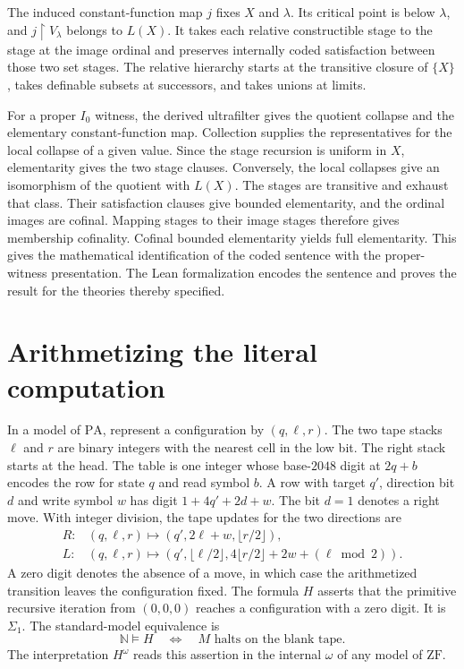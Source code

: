 \documentclass[11pt,letterpaper]{article}
\theoremstyle{definition}
\newcommand{\ZF}{\mathrm{ZF}}
\newcommand{\PA}{\mathrm{PA}}
\newcommand{\N}{\mathbb{N}}
\newcommand{\setread}[1]{#1^{\omega}}
\begin{document}
The induced constant-function map $j$ fixes $X$ and $\lambda$.
Its critical point is below $\lambda$, and $j\upharpoonright V_\lambda$
belongs to $L(X)$. It takes each relative constructible stage to
the stage at the image ordinal and preserves internally coded
satisfaction between those two set stages. The relative hierarchy
starts at the transitive closure of $\{X\}$, takes definable subsets
at successors, and takes unions at limits.

For a proper $I_0$ witness, the derived ultrafilter gives the
quotient collapse and the elementary constant-function map.
Collection supplies the representatives for the local collapse
of a given value. Since the stage recursion is uniform in $X$,
elementarity gives the two stage clauses. Conversely, the local
collapses give an isomorphism of the quotient with $L(X)$.
The stages are transitive and exhaust that class. Their satisfaction
clauses give bounded elementarity, and the ordinal images are
cofinal. Mapping stages to their image stages therefore gives
membership cofinality. Cofinal bounded elementarity yields full
elementarity. This gives the mathematical identification of the
coded sentence with the proper-witness presentation. The Lean
formalization encodes the sentence and proves the result for
the theories thereby specified.

\section{Arithmetizing the literal computation}\label{sec:arithmetic}

In a model of $\PA$, represent a configuration by $(q,\ell,r)$.
The two tape stacks $\ell$ and $r$ are binary integers with the nearest
cell in the low bit. The right stack starts at the head. The table is
one integer whose base-$2048$ digit at $2q+b$ encodes the row for
state $q$ and read symbol $b$. A row with target $q'$, direction
bit $d$ and write symbol $w$ has digit $1+4q'+2d+w$.
The bit $d=1$ denotes a right move. With integer division, the tape
updates for the two directions are
\[
\begin{array}{ll}
 R: & (q,\ell,r)\longmapsto (q',2\ell+w,\lfloor r/2\rfloor),\\
 L: & (q,\ell,r)\longmapsto
 (q',\lfloor\ell/2\rfloor,4\lfloor r/2\rfloor+2w+(\ell\bmod 2)).
\end{array}
\]
A zero digit denotes the absence of a move, in which case the
arithmetized transition leaves the configuration fixed. The formula
$H$ asserts that the primitive recursive iteration from $(0,0,0)$
reaches a configuration with a zero digit. It is $\Sigma_1$.
The standard-model equivalence is
\[
   \N\models H \quad\Longleftrightarrow\quad
   M\text{ halts on the blank tape}.
\]
The interpretation $\setread H$ reads this assertion in the internal
$\omega$ of any model of $\ZF$.
\end{document}
